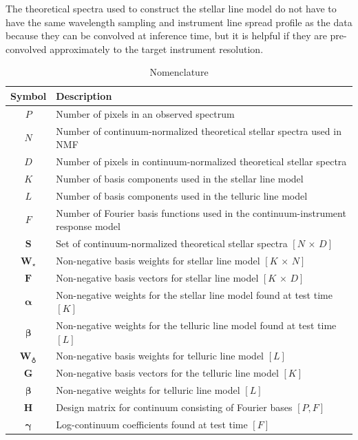 \documentclass[modern,linenumbers]{aastex631}
\renewcommand{\vec}[1]{\mathbf{#1}}
\newcommand{\vecalpha}{\boldsymbol{\alpha}}
\newcommand{\vecbeta}{\boldsymbol{\beta}}
\newcommand{\vecgamma}{\boldsymbol{\gamma}}
\newcommand{\vecW}{\mathbf{W}} %
\newcommand{\vecG}{\mathbf{G}} %
\newcommand{\vecH}{\mathbf{H}} %
\renewcommand{\added}[1]{#1}
\begin{document}
The theoretical spectra used to construct the stellar line model do not have to have the same wavelength sampling and instrument line spread profile as the data \added{because they can be convolved at inference time, but it is helpful if they are pre-convolved approximately to the target instrument resolution.}\\

\begin{table}
    \centering
    \caption{Nomenclature}
    \begin{tabular}{cl}
        \hline
        Symbol & Description \\
        \hline
        $P$ & Number of pixels in an observed spectrum\\
        $N$ & Number of continuum-normalized theoretical stellar spectra used in NMF\\
        $D$ & Number of pixels in continuum-normalized theoretical stellar spectra\\
        $K$ & Number of basis components used in the stellar line model\\
        $L$ & Number of basis components used in the telluric line model\\
        $F$ & Number of Fourier basis functions used in the continuum-instrument response model\\
        $\vec{S}$ & Set of continuum-normalized theoretical stellar spectra $[N\,\times\,D]$\\
        $\vecW_\star$ & Non-negative basis weights for stellar line model $[K\,\times\,N]$\\
        $\vec{F}$ & Non-negative basis vectors for stellar line model $[K\,\times\,D]$\\
        $\vecalpha$ & Non-negative weights for the stellar line model found at test time $[K]$\\
        $\vecbeta$ & Non-negative weights for the telluric line model found at test time $[L]$\\
        $\vecW_\earth$ & Non-negative basis weights for telluric line model $[L]$ \\
        $\vecG$ & Non-negative basis vectors for the telluric line model $[K]$ \\
        $\vecbeta$ & Non-negative weights for telluric line model $[L]$ \\
        $\vecH$ & Design matrix for continuum consisting of Fourier bases $[P, F]$\\
        $\vecgamma$ & Log-continuum coefficients found at test time $[F]$ \\

\end{tabular}
\end{table}
\end{document}
